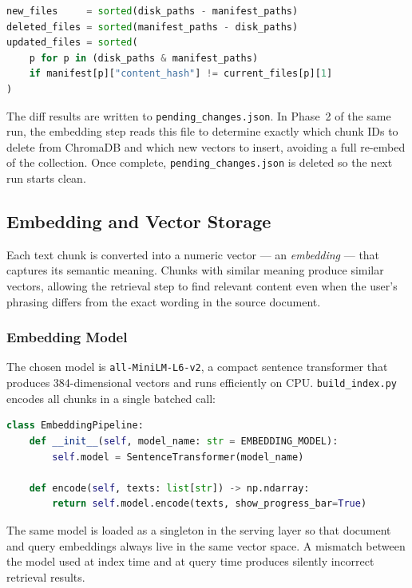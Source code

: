 \begin{lstlisting}[language=Python]
new_files     = sorted(disk_paths - manifest_paths)
deleted_files = sorted(manifest_paths - disk_paths)
updated_files = sorted(
    p for p in (disk_paths & manifest_paths)
    if manifest[p]["content_hash"] != current_files[p][1]
)
\end{lstlisting}

The diff results are written to \texttt{pending\_changes.json}. In Phase~2 of
the same run, the embedding step reads this file to determine exactly which
chunk IDs to delete from ChromaDB and which new vectors to insert, avoiding a
full re-embed of the collection. Once complete, \texttt{pending\_changes.json}
is deleted so the next run starts clean.
\subsection{Embedding and Vector Storage}
\label{sec:impl-embedding}

Each text chunk is converted into a numeric vector — an
\emph{embedding} — that captures its semantic meaning. Chunks with similar
meaning produce similar vectors, allowing the retrieval step to find relevant
content even when the user's phrasing differs from the exact wording in the
source document.

\subsubsection{Embedding Model}
\label{sec:impl-embedding-model}
The chosen model is \texttt{all-MiniLM-L6-v2}, a compact sentence transformer
that produces 384-dimensional vectors and runs efficiently on CPU.
\texttt{build\_index.py} encodes all chunks in a single batched call:

\begin{lstlisting}[language=Python]
class EmbeddingPipeline:
    def __init__(self, model_name: str = EMBEDDING_MODEL):
        self.model = SentenceTransformer(model_name)

    def encode(self, texts: list[str]) -> np.ndarray:
        return self.model.encode(texts, show_progress_bar=True)
\end{lstlisting}

The same model is loaded as a singleton in the serving layer so that document
and query embeddings always live in the same vector space. A mismatch between
the model used at index time and at query time produces silently incorrect
retrieval results.

